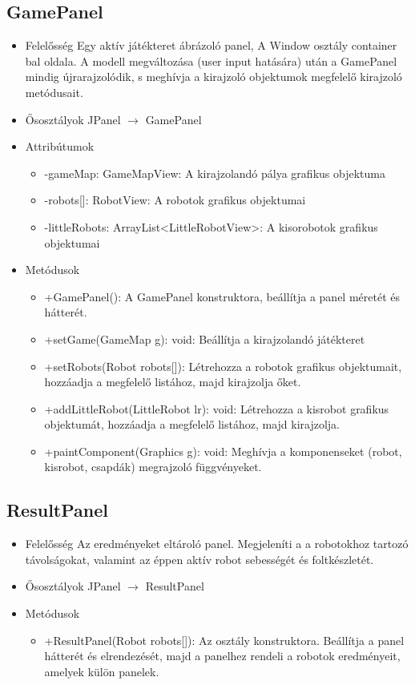 \subsection{GamePanel}
\begin{itemize}
	\item Felelősség\newline
	Egy aktív játékteret ábrázoló panel, A Window osztály container bal oldala. A modell megváltozása (user input hatására) után a GamePanel mindig újrarajzolódik, s meghívja a kirajzoló objektumok megfelelő kirajzoló metódusait.
	\item Ősosztályok\newline
		JPanel $\rightarrow$ GamePanel
	\item Attribútumok
	\begin{itemize}
		\item -gameMap: GameMapView: A kirajzolandó pálya grafikus objektuma
		\item -robots[]: RobotView: A robotok grafikus objektumai
		\item -littleRobots: ArrayList<LittleRobotView>: A kisorobotok grafikus objektumai
	\end{itemize}
	\item Metódusok
	\begin{itemize}
		\item +GamePanel(): A GamePanel konstruktora, beállítja a panel méretét és hátterét.
		\item +setGame(GameMap g): void: Beállítja a kirajzolandó játékteret
		\item +setRobots(Robot robots[]): Létrehozza a robotok grafikus objektumait, hozzáadja a megfelelő listához, majd kirajzolja őket.
		\item +addLittleRobot(LittleRobot lr): void: Létrehozza a kisrobot grafikus objektumát, hozzáadja a megfelelő listához, majd kirajzolja.
		\item +paintComponent(Graphics g): void: Meghívja a komponenseket (robot, kisrobot, csapdák) megrajzoló függvényeket.
	\end{itemize}
\end{itemize}

\subsection{ResultPanel}
\begin{itemize}
	\item Felelősség
	Az eredményeket eltároló panel. Megjeleníti a a robotokhoz tartozó távolságokat, valamint az éppen aktív robot sebességét és foltkészletét.
	\item Ősosztályok\newline
		JPanel $\rightarrow$ ResultPanel
		
		\item Metódusok
		\begin{itemize}
			\item +ResultPanel(Robot robots[]): Az osztály konstruktora. Beállítja a panel hátterét és elrendezését, majd a panelhez rendeli a robotok eredményeit, amelyek külön panelek.
		\end{itemize}
	\end{itemize}
	
